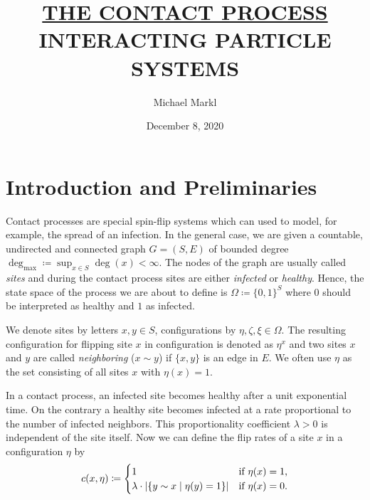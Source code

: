 \documentclass[a4paper,11pt]{amsart}
\title{\href{https://schedulaar.github.io/contact-processes}{THE CONTACT PROCESS}\\
{\footnotesize INTERACTING PARTICLE SYSTEMS}}
\author{Michael Markl}
\date{December 8, 2020}
\theoremstyle{theorem}
\theoremstyle{definition}
\DeclarePairedDelimiter\abs{\lvert}{\rvert}%
\begin{document}
\thispagestyle{empty}
\maketitle

\section{Introduction and Preliminaries}

Contact processes are special spin-flip systems which can used to model, for example, the spread of an infection.
In the general case, we are given a countable, undirected and connected graph $G=(S,E)$ of bounded degree $\deg_{\max}\coloneqq \sup_{x\in S} \deg(x) < \infty$.
The nodes of the graph are usually called \emph{sites} and during the contact process sites are either \emph{infected} or \emph{healthy}.
Hence, the state space of the process we are about to define is $\Omega\coloneqq \{0, 1\}^S$ where $0$ should be interpreted as healthy and $1$ as infected.

We denote sites by letters $x,y \in S$, configurations by $\eta, \zeta, \xi\in\Omega$.
The resulting configuration for flipping site $x$ in configuration is denoted as $\eta^x$ and two sites $x$ and $y$ are called \emph{neighboring} ($x \sim y$) if $\{x,y\}$ is an edge in $E$.
We often use $\eta$ as the set consisting of all sites $x$ with $\eta(x)=1$.

In a contact process, an infected site becomes healthy after a unit exponential time.
On the contrary a healthy site becomes infected at a rate proportional to the number of infected neighbors.
This proportionality coefficient $\lambda > 0$ is independent of the site itself.
Now we can define the flip rates of a site $x$ in a configuration $\eta$ by $$c(x,\eta) \coloneqq \begin{cases}
	1 & \text{if $\eta(x) = 1$,} \\
	\lambda \cdot \abs{ \{ y\sim x \mid \eta(y) = 1 \} } & \text{if $\eta(x) = 0$.}
\end{cases}$$
\end{document}
